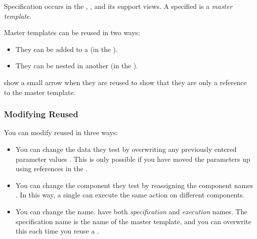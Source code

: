 \label{specexec}

Specification occurs in the \gdtestcasebrowser{}, , \gdtestcaseeditor{} and its support views. A specified \gdcase{} is a \emph{master template}. 

Master templates can be reused in two ways: 

\begin{itemize}
\item  They can be added to a \gdsuite{} (in the \gdtestsuiteeditor{}). 
\item They can be nested in another \gdcase{} (in the \gdtestcaseeditor{}). 
\end{itemize}

\gdcases{} show a small arrow when they are reused to show that they are only a reference to the master template.  


\subsubsection{Modifying Reused \gdcases}
You can modify reused \gdcases{} in three ways:
\begin{itemize}
\item You can change the data they test by overwriting any previously entered parameter values . This is only possible if you have moved the parameters up using references in the \gdsteps{}. 
\item You can change the component they test by reassigning the component names . In this way, a single \gdcase{} can execute the same action on different components.  
\item You can change the \gdcase{} name. \gdcases{} have both \emph{specification} and \emph{execution} 
names. The specification name is the name of the master template, and you can overwrite this each time you reuse a \gdcase{}.  
\end{itemize}

